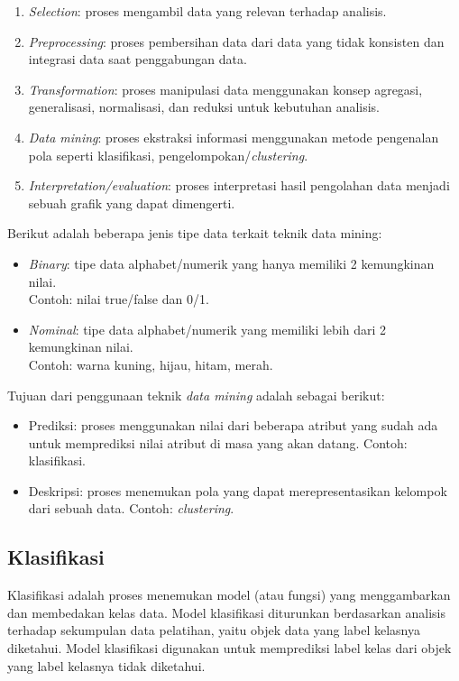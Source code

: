 \begin{enumerate}
\item \textit{Selection}: proses mengambil data yang relevan terhadap analisis.
\item \textit{Preprocessing}: proses pembersihan data dari data yang tidak konsisten dan integrasi data saat penggabungan data.
\item \textit{Transformation}: proses manipulasi data menggunakan konsep agregasi, generalisasi, normalisasi, dan reduksi untuk kebutuhan analisis.
\item \textit{Data mining}: proses ekstraksi informasi menggunakan metode pengenalan pola seperti klasifikasi, pengelompokan/\textit{clustering}.
\item \textit{Interpretation/evaluation}: proses interpretasi hasil pengolahan data menjadi sebuah grafik yang dapat dimengerti.
\end{enumerate}


\noindent Berikut adalah beberapa jenis tipe data terkait teknik data mining:

\begin{itemize}

\item \textit{Binary}: tipe data alphabet/numerik yang hanya memiliki 2 kemungkinan nilai. \\ Contoh: nilai true/false dan 0/1.

\item \textit{Nominal}: tipe data alphabet/numerik yang memiliki lebih dari 2 kemungkinan nilai.\\ Contoh: warna  kuning, hijau, hitam, merah.

\end{itemize}

\noindent Tujuan dari penggunaan teknik \textit{data mining} adalah sebagai berikut:

\begin{itemize}

\item Prediksi: proses menggunakan nilai dari beberapa atribut yang sudah ada untuk memprediksi nilai atribut di masa yang akan datang. Contoh: klasifikasi.

\item Deskripsi: proses menemukan pola yang dapat merepresentasikan kelompok dari sebuah data. Contoh: \textit{clustering}.

\end{itemize}

\subsection{Klasifikasi} 
Klasifikasi adalah proses menemukan model (atau fungsi) yang menggambarkan dan membedakan kelas data. Model klasifikasi diturunkan berdasarkan analisis terhadap sekumpulan data pelatihan, yaitu objek data yang label kelasnya diketahui. Model klasifikasi digunakan untuk memprediksi label kelas dari objek yang label kelasnya tidak diketahui.\\

